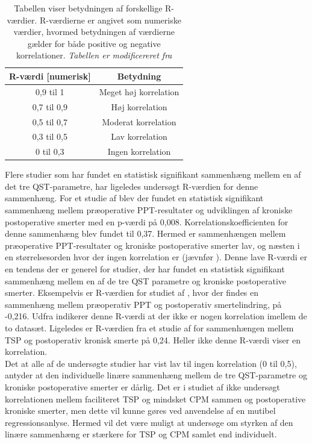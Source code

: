 \begin{table}[H]
\centering
\begin{tabular}{cc}
\rowcolor[HTML]{C0C0C0} 
R-værdi {[}numerisk{]} & Betydning  \\ \hline
0,9 til 1              & Meget høj korrelation              \\
0,7 til 0,9            & Høj korrelation                    \\
0,5 til 0,7            & Moderat korrelation                \\
0,3 til 0,5            & Lav korrelation                    \\
0 til 0,3              & Ingen korrelation                  \\ \hline
\end{tabular}
\caption{Tabellen viser betydningen af forskellige R-værdier. R-værdierne er angivet som numeriske værdier, hvormed betydningen af værdierne gælder for både positive og negative korrelationer. \textit{Tabellen er modificereret fra }}
\label{tab:styrke_r}
\end{table}

Flere studier som har fundet en statistisk signifikant sammenhæng mellem en af det tre QST-parametre, har ligeledes undersøgt R-værdien for denne sammenhæng. For et studie af  blev der fundet en statistisk signifikant sammenhæng mellem præoperative PPT-resultater og udviklingen af kroniske postoperative smerter med en p-værdi på 0,008. Korrelationskoefficienten for denne sammenhæng blev fundet til 0,37. Hermed er sammenhængen mellem præoperative PPT-resultater og kroniske postoperative smerter lav, og næsten i en størrelsesorden hvor der ingen korrelation er (jævnfør ). Denne lave R-værdi er en tendens der er generel for studier, der har fundet en statistisk signifikant sammenhæng mellem en af de tre QST parametre og kroniske postoperative smerter. Eksempelvis er R-værdien for studiet af , hvor der findes en sammenhæng mellem præoperativ PPT og postoperativ smertelindring, på -0,216. Udfra  indikerer denne R-værdi at der ikke er nogen korrelation imellem de to datasæt. Ligeledes er R-værdien fra et studie af  for sammenhængen mellem TSP og postoperativ kronisk smerte på 0,24. Heller ikke denne R-værdi viser en korrelation. \\
Det at alle af de undersøgte studier har vist lav til ingen korrelation (0 til 0,5), antyder at den individuelle linære sammenhæng mellem de tre QST-parametre og kroniske postoperative smerter er dårlig. Det er i studiet af  ikke undersøgt korrelationen mellem faciliteret TSP og mindsket CPM sammen og postoperative kroniske smerter, men dette vil kunne gøres ved anvendelse af en mutibel regressionsanlyse. \citep{Zar2010} Hermed vil det være muligt at undersøge om styrken af den linære sammenhæng er stærkere for TSP og CPM samlet end individuelt.   

